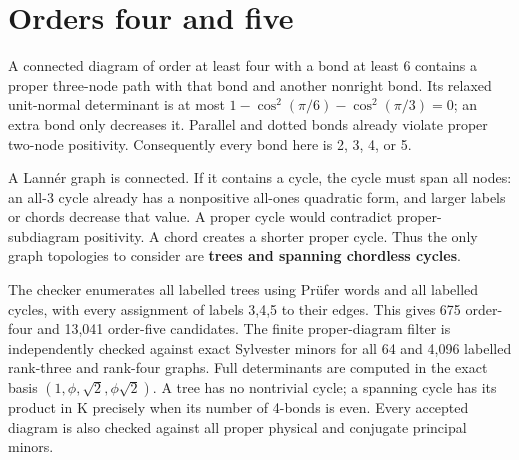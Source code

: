 \documentclass[
  10pt,
]{report}
\begin{document}
\section{Orders four and five}\label{orders-four-and-five}

A connected diagram of order at least four with a bond at least 6
contains a proper three-node path with that bond and another nonright
bond. Its relaxed unit-normal determinant is at most
\(1-\cos^2(\pi/6)-\cos^2(\pi/3)=0\); an extra bond only decreases it.
Parallel and dotted bonds already violate proper two-node positivity.
Consequently every bond here is 2, 3, 4, or 5.

A Lannér graph is connected. If it contains a cycle, the cycle must span
all nodes: an all-3 cycle already has a nonpositive all-ones quadratic
form, and larger labels or chords decrease that value. A proper cycle
would contradict proper-subdiagram positivity. A chord creates a shorter
proper cycle. Thus the only graph topologies to consider are
\textbf{trees and spanning chordless cycles}.

The checker enumerates all labelled trees using Prüfer words and all
labelled cycles, with every assignment of labels 3,4,5 to their edges.
This gives 675 order-four and 13,041 order-five candidates. The finite
proper-diagram filter is independently checked against exact Sylvester
minors for all 64 and 4,096 labelled rank-three and rank-four graphs.
Full determinants are computed in the exact basis
\((1,\phi,\sqrt2,\phi\sqrt2)\). A tree has no nontrivial cycle; a
spanning cycle has its product in K precisely when its number of 4-bonds
is even. Every accepted diagram is also checked against all proper
physical and conjugate principal minors.
\end{document}
